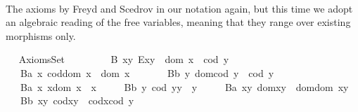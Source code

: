 \begin{isabellebody}
\ \ \ \ \isamarkupfalse%
%
\endisatagproof
{\isafoldproof}%
%
\isadelimproof
\isanewline
%
\endisadelimproof
\ \ \isamarkupfalse%
%
\isamarkuptrue%
%
\begin{isamarkuptext}%
The axioms by Freyd and Scedrov in our notation again, but this time we adopt 
      an algebraic reading of the free variables, meaning that they range over existing 
      morphisms only.%
\end{isamarkuptext}\isamarkuptrue%
\ \isamarkupfalse%
\ AxiomsSet{}\ {\isacharequal}\ \isanewline
\ \ \isanewline
\ \ \ \ B{}{\isacharcolon}\ {\isachardoublequoteopen}\isactrlbold {\isasymforall}x{\isachardot}\isactrlbold {\isasymforall}y{\isachardot}\ E{\isacharparenleft}x{\isasymcdot}y{\isacharparenright}\ \isactrlbold {\isasymleftrightarrow}\ dom\ x\ {\isasymcong}\ cod\ y{\isachardoublequoteclose}\ \isanewline
\ \ \ B{}a{\isacharcolon}\ {\isachardoublequoteopen}\isactrlbold {\isasymforall}x{\isachardot}\ cod{\isacharparenleft}dom\ x{\isacharparenright}\ {\isasymcong}\ dom\ x\ {\isachardoublequoteclose}\ \ \ \isanewline
\ \ \ B{}b{\isacharcolon}\ {\isachardoublequoteopen}\isactrlbold {\isasymforall}y{\isachardot}\ dom{\isacharparenleft}cod\ y{\isacharparenright}\ {\isasymcong}\ cod\ y{\isachardoublequoteclose}\ \ \ \isanewline
\ \ \ B{}a{\isacharcolon}\ {\isachardoublequoteopen}\isactrlbold {\isasymforall}x{\isachardot}\ x{\isasymcdot}{\isacharparenleft}dom\ x{\isacharparenright}\ {\isasymcong}\ x{\isachardoublequoteclose}\ \ \isanewline
\ \ \ B{}b{\isacharcolon}\ {\isachardoublequoteopen}\isactrlbold {\isasymforall}y{\isachardot}\ {\isacharparenleft}cod\ y{\isacharparenright}{\isasymcdot}y\ {\isasymcong}\ y{\isachardoublequoteclose}\ \ \isanewline
\ \ \ B{}a{\isacharcolon}\ {\isachardoublequoteopen}\isactrlbold {\isasymforall}x{\isachardot}\isactrlbold {\isasymforall}y{\isachardot}\ dom{\isacharparenleft}x{\isasymcdot}y{\isacharparenright}\ {\isasymcong}\ dom{\isacharparenleft}{\isacharparenleft}dom\ x{\isacharparenright}{\isasymcdot}y{\isacharparenright}{\isachardoublequoteclose}\ \ \isanewline
\ \ \ B{}b{\isacharcolon}\ {\isachardoublequoteopen}\isactrlbold {\isasymforall}x{\isachardot}\isactrlbold {\isasymforall}y{\isachardot}\ cod{\isacharparenleft}x{\isasymcdot}y{\isacharparenright}\ {\isasymcong}\ cod{\isacharparenleft}x{\isasymcdot}{\isacharparenleft}cod\ y{\isacharparenright}{\isacharparenright}{\isachardoublequoteclose}\ \ \isanewline

\end{isabellebody}
